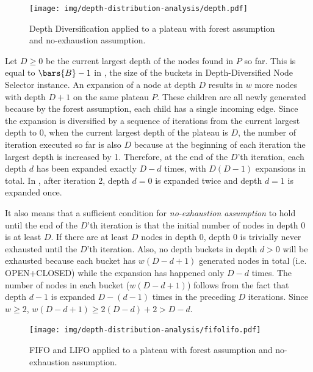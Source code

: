 \begin{figure}[hp]
  \centering
  \texttt{[image: img/depth-distribution-analysis/depth.pdf]}
 \label{fig:depth-distribution-analysis}
 \caption{Depth Diversification applied to a plateau 
with forest assumption and no-exhaustion assumption.}
\end{figure}

Let $D\geq 0$ be the current largest depth of the nodes found in $P$ so far.
This is equal to $\bars{B}-1$ in ,
the size of the buckets in Depth-Diversified Node Selector instance.
An expansion of a node at depth $D$ results in $w$ more nodes with depth $D+1$ on the same plateau $P$.
These children are all newly generated because by the forest assumption, each child has a single incoming edge.
Since the expansion is
diversified by a sequence of iterations from the current largest depth to 0, when the current
largest depth of the plateau is $D$, the number of iteration executed so far is also $D$ because
at the beginning of each iteration the largest depth is increased by 1.
Therefore, at the end of the $D$'th iteration,
each depth $d$ has been expanded exactly $D-d$ times, with $D(D-1)$ expansions in total.
In ,
after iteration 2, depth $d=0$ is expanded twice and depth $d=1$ is expanded once.

It also means that a sufficient condition for \emph{no-exhaustion assumption} to hold until the end of the $D$'th
iteration is that the initial number of nodes in depth 0 is at least $D$.  If there are at least $D$ nodes in depth
0, depth 0 is trivially never exhausted until the $D$'th iteration. Also, no depth buckets in depth $d>0$ will be exhausted 
because each bucket has $w(D-d+1)$ generated nodes in total (i.e. OPEN+CLOSED) while the expansion has
happened only $D-d$ times.
The number of nodes in each bucket ($w(D-d+1)$) follows from the fact that  depth $d-1$ is expanded $D-(d-1)$ times in the preceding $D$ iterations.
Since $w\geq 2$, $w(D-d+1)\geq 2(D-d)+2>D-d$.

\begin{figure}[hp]
  \centering
  \texttt{[image: img/depth-distribution-analysis/fifolifo.pdf]}
 \label{fig:depth-distribution-analysis-fifolifo}
 \caption{FIFO and LIFO applied to a plateau
 with forest assumption and no-exhaustion assumption.}
\end{figure}

